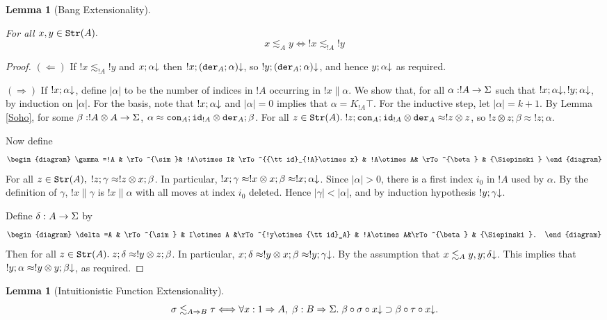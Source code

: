 \documentclass[11pt]{article}
\newtheorem{lemma}[theorem]{Lemma}
\newcommand{\Ip}[1]{\lesssim_{#1}}
\begin{document}
\begin{lemma}[Bang Extensionality]\label{BE}

For all $x,y\in{\tt Str}(A).$
$$x\Ip A y \Longleftrightarrow !x\Ip{!A} !y$$
\end{lemma}
\begin{proof} $(\Leftarrow)$ If $!x\Ip{!A} !y$ and
$x;\alpha{\downarrow}$ then $!x;({\tt der}_A;\alpha){\downarrow}$, so
$!y;({\tt der}_A;\alpha){\downarrow}$, and hence
$y;\alpha{\downarrow}$ as required.

$(\Rightarrow)$ If $!x;\alpha{\downarrow}$, define $| \alpha|$ to be
the number of indices in $!A$ occurring in $!x \|\alpha$. We show
that, for all $\alpha:!A\rightarrow {{\Sigma}}$ such that
$!x;\alpha{\downarrow}, !y;\alpha{\downarrow}$, by induction on
$|\alpha|$.  For the basis, note that $!x;\alpha{\downarrow}$ and $|\alpha|=0$
implies that $\alpha=K_{!A}\top$. For the inductive step, let
$|\alpha|=k+1$. By Lemma \ref{Soho}, for some $\beta:!A\otimes
A\rightarrow {{\Sigma}}$,
$\alpha\approx{\tt con}_A;{\tt id}_{!A}\otimes{\tt der}_A;\beta$. For all
$z\in{\tt Str}(A). \;
!z;{\tt con}_A;{\tt id}_{!A}\otimes{\tt der}_A\approx !z\otimes z$, so
$!z\otimes z;\beta\approx !z;\alpha$.

Now define
\[\begin{diagram}
\gamma=!A & \rTo^{\sim}& !A\otimes I& \rTo^{{\tt id}_{!A}\otimes x} &
!A\otimes A& \rTo^{\beta} & {\Siepinski}
\end{diagram}\]
For all $z\in{\tt Str}(A),\; !z;\gamma\approx !z\otimes x;\beta$. In
particular, $!x;\gamma\approx !x\otimes x;\beta\approx
!x;\alpha{\downarrow}$.
Since $|\alpha|>0$, there is a first index $i_0$ in $!A$ used by
$\alpha$. By the definition of $\gamma$, $!x\| \gamma$ is
$!x \| \alpha$ with all moves at index $i_0$ deleted. Hence
$|\gamma|<|\alpha|$, and by induction hypothesis
$!y;\gamma{\downarrow}$.

Define $\delta:A\rightarrow {{\Sigma}}$ by
\[\begin{diagram}
\delta=A & \rTo^{\sim} & I\otimes A &\rTo^{!y\otimes{\tt id}_A} &
!A\otimes A&\rTo^{\beta} & {\Siepinski}.
\end{diagram} \]
Then for all $z\in{\tt Str}(A).\;  z;\delta\approx!y\otimes
z;\beta$. In particular, $x;\delta\approx !y\otimes x;\beta\approx
!y;\gamma{\downarrow}$. By the assumption that $x\Ip A y,
y;\delta\converges$. This implies that $!y;\alpha\approx !y\otimes
y;\beta{\downarrow}$, as required.
\end{proof}

\begin{lemma}[Intuitionistic Function Extensionality]
$$\sigma \Ip{A\Rightarrow B}\tau \Longleftrightarrow
\forall x: 1\Rightarrow A,\; \beta :B\Rightarrow {\Siepinski}.
\; \beta\circ\sigma\circ x\converges \supset \beta\circ\tau\circ x\converges.$$
\end{lemma}
\end{document}
